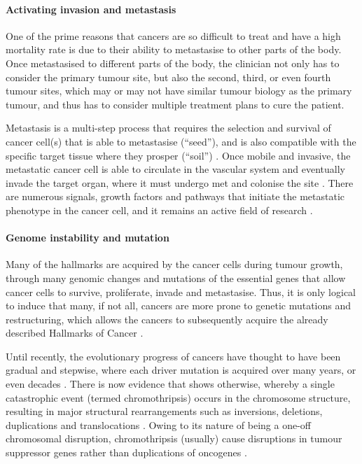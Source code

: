\paragraph{Activating invasion and metastasis}

\noindent
One of the prime reasons that cancers are so difficult to treat and have a high mortality rate is due to their ability to metastasise to other parts of the body.
Once metastasised to different parts of the body, the clinician not only has to consider the primary tumour site, but also the second, third, or even fourth tumour sites, which may or may not have similar tumour biology as the primary tumour, and thus has to consider multiple treatment plans to cure the patient.

Metastasis is a multi-step process that requires the selection and survival of cancer cell(s) that is able to metastasise (``seed''), and is also compatible with the specific target tissue where they prosper (``soil'') \citep{Talmadge2010}.
Once mobile and invasive, the metastatic cancer cell is able to circulate in the vascular system and eventually invade the target organ, where it must undergo \gls{met} and colonise the site \citep{Hanahan2011,Kalluri2009}.
There are numerous signals, growth factors and pathways that initiate the metastatic phenotype in the cancer cell, and it remains an active field of research \citep{Hanahan2011,Kalluri2009}.

\paragraph{Genome instability and mutation}

\noindent
Many of the hallmarks are acquired by the cancer cells during tumour growth, through many genomic changes and mutations of the essential genes that allow cancer cells to survive, proliferate, invade and metastasise.
Thus, it is only logical to induce that many, if not all, cancers are more prone to genetic mutations and restructuring, which allows the cancers to subsequently acquire the already described Hallmarks of Cancer \citep{Hanahan2011}.

Until recently, the evolutionary progress of cancers have thought to have been gradual and stepwise, where each driver mutation is acquired over many years, or even decades \citep{Stephens2011}.
There is now evidence that shows otherwise, whereby a single catastrophic event (termed \gls{chromothripsis}) occurs in the chromosome structure, resulting in major structural rearrangements such as inversions, deletions, duplications and translocations \citep{Leibowitz2015,Stephens2011}.
Owing to its nature of being a one-off chromosomal disruption, \gls{chromothripsis} (usually) cause disruptions in tumour suppressor genes rather than duplications of oncogenes \citep{Leibowitz2015}.

